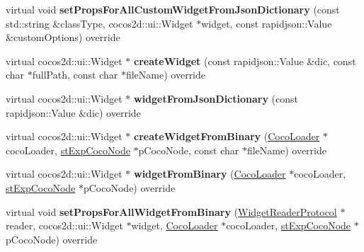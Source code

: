 \begin{DoxyCompactItemize}
\item 
\mbox{\label{classcocostudio_1_1WidgetPropertiesReader0250_a6787b56a7caa2a2346ce70d190118f87}} 
virtual void {\bfseries set\+Props\+For\+All\+Custom\+Widget\+From\+Json\+Dictionary} (const std\+::string \&class\+Type, cocos2d\+::ui\+::\+Widget $\ast$widget, const rapidjson\+::\+Value \&custom\+Options) override
\item 
\mbox{\label{classcocostudio_1_1WidgetPropertiesReader0250_a0d74292ebc31031274d743fbf988e9af}} 
virtual cocos2d\+::ui\+::\+Widget $\ast$ {\bfseries create\+Widget} (const rapidjson\+::\+Value \&dic, const char $\ast$full\+Path, const char $\ast$file\+Name) override
\item 
\mbox{\label{classcocostudio_1_1WidgetPropertiesReader0250_ae011bd2d4e1f538976280527627f3a04}} 
virtual cocos2d\+::ui\+::\+Widget $\ast$ {\bfseries widget\+From\+Json\+Dictionary} (const rapidjson\+::\+Value \&dic) override
\item 
\mbox{\label{classcocostudio_1_1WidgetPropertiesReader0250_abcfac6f8d2275872121d82009ee8fa24}} 
virtual cocos2d\+::ui\+::\+Widget $\ast$ {\bfseries create\+Widget\+From\+Binary} (\hyperlink{classcocostudio_1_1CocoLoader}{Coco\+Loader} $\ast$coco\+Loader, \hyperlink{structcocostudio_1_1stExpCocoNode}{st\+Exp\+Coco\+Node} $\ast$p\+Coco\+Node, const char $\ast$file\+Name) override
\item 
\mbox{\label{classcocostudio_1_1WidgetPropertiesReader0250_a67568ef011c67bd5b1e814b22d67f726}} 
virtual cocos2d\+::ui\+::\+Widget $\ast$ {\bfseries widget\+From\+Binary} (\hyperlink{classcocostudio_1_1CocoLoader}{Coco\+Loader} $\ast$coco\+Loader, \hyperlink{structcocostudio_1_1stExpCocoNode}{st\+Exp\+Coco\+Node} $\ast$p\+Coco\+Node) override
\item 
\mbox{\label{classcocostudio_1_1WidgetPropertiesReader0250_a6ede8a291fbb6520d9e772e231f65285}} 
virtual void {\bfseries set\+Props\+For\+All\+Widget\+From\+Binary} (\hyperlink{classcocostudio_1_1WidgetReaderProtocol}{Widget\+Reader\+Protocol} $\ast$reader, cocos2d\+::ui\+::\+Widget $\ast$widget, \hyperlink{classcocostudio_1_1CocoLoader}{Coco\+Loader} $\ast$coco\+Loader, \hyperlink{structcocostudio_1_1stExpCocoNode}{st\+Exp\+Coco\+Node} $\ast$p\+Coco\+Node) override

\end{DoxyCompactItemize}
